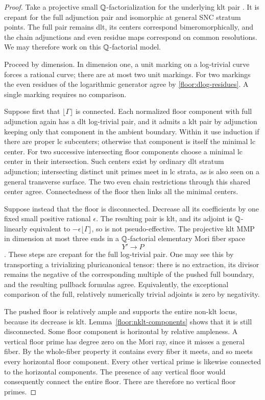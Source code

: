 \begin{proof}
Take a projective small $\mathbb{Q}$-factorialization for the
underlying klt pair \cite{BCHM}.  It is crepant for the full
adjunction pair and isomorphic at general SNC stratum
points.  The full pair remains dlt, its centers correspond
bimeromorphically, and the chain adjunctions and even residue
maps correspond on common resolutions.  We may therefore
work on this $\mathbb{Q}$-factorial model.

Proceed by dimension.  In dimension one, a unit marking on
a log-trivial curve forces a rational curve; there are at
most two unit markings.  For two markings the even residues
of the logarithmic generator agree by
\eqref{floor:dlog-residues}.  A single marking requires no
comparison.

Suppose first that $\lfloor\Gamma\rfloor$ is connected.
Each normalized floor component with full adjunction again
has a dlt log-trivial pair, and it admits a klt pair by
adjunction keeping only that component in the ambient
boundary.  Within it use induction if there are proper
lc subcenters; otherwise that component is itself the
minimal lc center.  For two successive intersecting floor
components choose a minimal lc center in their intersection.
Such centers exist by ordinary dlt stratum adjunction;
intersecting distinct unit primes meet in lc strata, as is
also seen on a general transverse surface.  The two even
chain restrictions through this shared center agree.
Connectedness of the floor then links all the minimal
centers.

Suppose instead that the floor is disconnected.  Decrease
all its coefficients by one fixed small positive rational
$\epsilon$.  The resulting pair is klt, and its adjoint
is $\mathbb{Q}$-linearly equivalent to
$-\epsilon\lfloor\Gamma\rfloor$, so is not
pseudo-effective.  The projective klt MMP in dimension at
most three ends in a $\mathbb{Q}$-factorial elementary Mori fiber
space
\[
 Y'\longrightarrow P
\]
\cite{ThreefoldFlipsAbundance,BCHM}.  These steps are
crepant for the full log-trivial pair.  One may see this
by transporting a trivializing pluricanonical tensor:
there is no extraction, its divisor remains the negative
of the corresponding multiple of the pushed full boundary,
and the resulting pullback formulas agree.  Equivalently,
the exceptional comparison of the full, relatively
numerically trivial adjoints is zero by negativity.

The pushed floor is relatively ample and supports the
entire non-klt locus, because its decrease is klt.
Lemma~\ref{floor:nklt-components} shows that it is still
disconnected.  Some floor component is horizontal by
relative ampleness.  A vertical floor prime has degree
zero on the Mori ray, since it misses a general fiber.
By the whole-fiber property it contains every fiber it
meets, and so meets every horizontal floor component.
Every other vertical prime is likewise connected to the
horizontal components.  The presence of any vertical
floor would consequently connect the entire floor.
There are therefore no vertical floor primes.


\end{proof}
